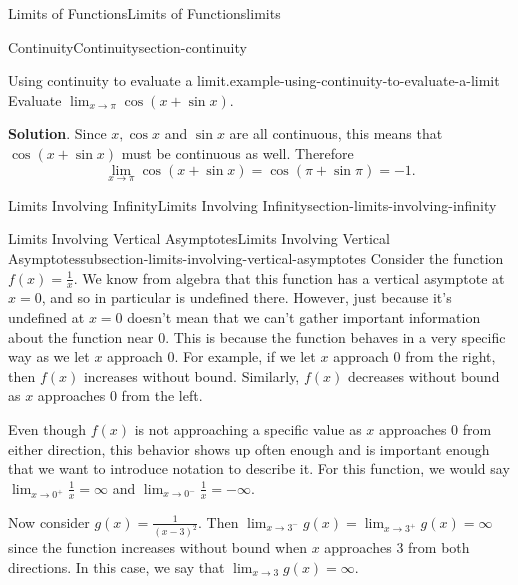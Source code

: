 \documentclass[oneside,10pt,]{book}
\numberwithin{equation}{section}
\begin{document}
\begin{chapterptx}{Limits of Functions}{}{Limits of Functions}{}{}{limits}
\begin{sectionptx}{Continuity}{}{Continuity}{}{}{section-continuity}
\begin{example}{Using continuity to evaluate a limit.}{example-using-continuity-to-evaluate-a-limit}%
\hypertarget{p-50}{}%
Evaluate \(\lim_{x\to\pi}\cos(x+\sin x)\).%
\par\smallskip%
\noindent\textbf{Solution}.\hypertarget{solution-10}{}\quad%
\hypertarget{p-51}{}%
Since \(x, \cos x\) and \(\sin x\) are all continuous, this means that \(\cos(x+\sin x)\) must be continuous as well. Therefore%
\begin{equation*}
\lim_{x\to\pi}\cos(x+\sin x) = \cos(\pi+\sin\pi) = -1.
\end{equation*}
%
\end{example}
\end{sectionptx}
%
%
\typeout{************************************************}
\typeout{************************************************}
%
\begin{sectionptx}{Limits Involving Infinity}{}{Limits Involving Infinity}{}{}{section-limits-involving-infinity}
%
%
\typeout{************************************************}
\typeout{************************************************}
%
\begin{subsectionptx}{Limits Involving Vertical Asymptotes}{}{Limits Involving Vertical Asymptotes}{}{}{subsection-limits-involving-vertical-asymptotes}
\hypertarget{p-52}{}%
Consider the function \(f(x)=\frac{1}{x}\). We know from algebra that this function has a vertical asymptote at \(x=0\), and so in particular is undefined there. However, just because it's undefined at \(x=0\) doesn't mean that we can't gather important information about the function near \(0\). This is because the function behaves in a very specific way as we let \(x\) approach \(0\). For example, if we let \(x\) approach \(0\) from the right, then \(f(x)\) increases without bound. Similarly, \(f(x)\) decreases without bound as \(x\) approaches \(0\) from the left.%
\par
\hypertarget{p-53}{}%
Even though \(f(x)\) is not approaching a specific value as \(x\) approaches \(0\) from either direction, this behavior shows up often enough and is important enough that we want to introduce notation to describe it. For this function, we would say \(\lim_{x\to0^{+}}\frac{1}{x}=\infty\) and \(\lim_{x\to0^{-}}\frac{1}{x}=-\infty\).%
\par
\hypertarget{p-54}{}%
Now consider \(g(x) = \frac{1}{(x-3)^{2}}\). Then \(\lim_{x\to3^{-}}g(x) = \lim_{x\to3^{+}}g(x) = \infty\) since the function increases without bound when \(x\) approaches \(3\) from both directions. In this case, we say that \(\lim_{x\to3}g(x)=\infty\).%

\end{subsectionptx}
\end{sectionptx}
\end{chapterptx}
\end{document}
